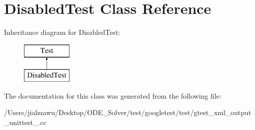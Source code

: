 \hypertarget{class_disabled_test}{}\section{Disabled\+Test Class Reference}
\label{class_disabled_test}
Inheritance diagram for Disabled\+Test\+:\begin{figure}[H]
\begin{center}
\leavevmode
\includegraphics[height=2.000000cm]{class_disabled_test}
\end{center}
\end{figure}


The documentation for this class was generated from the following file\+:\begin{DoxyCompactItemize}
\item 
/\+Users/jiahuawu/\+Desktop/\+O\+D\+E\+\_\+\+Solver/test/googletest/test/gtest\+\_\+xml\+\_\+output\+\_\+unittest\+\_\+.\+cc\end{DoxyCompactItemize}
